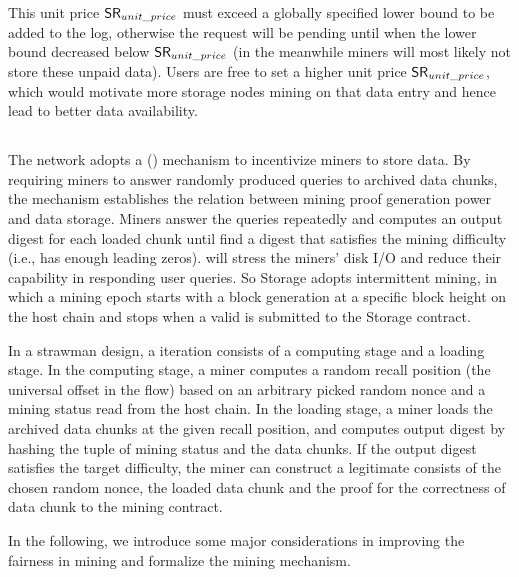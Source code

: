 This unit price $\mathsf{SR}_{unit\_price}$ must exceed a globally specified lower bound to be added to the log, otherwise the request will be pending until when the lower bound decreased below $\mathsf{SR}_{unit\_price}$ (in the meanwhile miners will most likely not store these unpaid data).
Users are free to set a higher unit price $\mathsf{SR}_{unit\_price}$,
which would motivate more storage nodes mining on that data entry and hence lead to better data availability.



\subsection{\proof}

The \project network adopts a \proof (\sproof) mechanism to incentivize miners to store data.
%
By requiring miners to answer randomly produced queries to archived data chunks, the \sproof mechanism establishes the relation between mining proof generation power and data storage.
%
Miners answer the queries repeatedly and computes an output digest for each loaded chunk until find a digest that satisfies the mining difficulty (i.e., has enough leading zeros). 
%
{\sproof} will stress the miners' disk I/O and reduce their capability in responding user queries.
%
So \projabbrev Storage adopts intermittent mining, in which 
%
a mining epoch starts with a block generation at a specific block height on the host chain and stops when a valid {\sproof} is submitted to the \projabbrev Storage contract. 

In a strawman design, a \sproof iteration consists of a computing stage and a loading stage. 
%
In the computing stage, a miner computes a random recall position (the universal offset in the flow) based on an arbitrary picked random nonce and a mining status read from the host chain.
%
In the loading stage, a miner loads the archived data chunks at the given recall position, and computes output digest by hashing the tuple of mining status and the data chunks. 
%
If the output digest satisfies the target difficulty, the miner can construct a legitimate \sproof consists of the chosen random nonce, the loaded data chunk and the proof for the correctness of data chunk to the mining contract. 

In the following, we introduce some major considerations in improving the fairness in {\sproof} mining and formalize the {\sproof} mining mechanism. 

%


